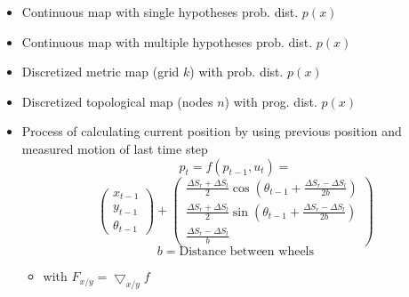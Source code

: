 \begin{itemize}
\begin{itemize}
                \begin{itemize}
                    \item Continuous map with single hypotheses prob. dist. $p(x)$
                    \item Continuous map with multiple hypotheses prob. dist. $p(x)$
                    \item Discretized metric map (grid $k$) with prob. dist. $p(x)$
                    \item Discretized topological map (nodes $n$) with prog. dist. $p(x)$
                \end{itemize}
        \end{itemize}
        \begin{itemize}
            \item Process of calculating current position by using previous position and measured motion of last time step
             
\[
    p_t = f(p_{t - 1}, u_t) =
\]
\[
    \begin{pmatrix}
        x_{t - 1}\\
        y_{t - 1}\\
        \theta_{t - 1}
    \end{pmatrix} +
    \begin{pmatrix}
        \frac{\Delta S_r + \Delta S_l}{2} \cos(\theta_{t - 1} + \frac{\Delta S_r - \Delta S_l}{2b})\\
        \frac{\Delta S_r + \Delta S_l}{2} \sin(\theta_{t - 1} + \frac{\Delta S_r - \Delta S_l}{2b})\\
        \frac{\Delta S_r - \Delta S_l}{b}
    \end{pmatrix}
\]
\[
b = \text{Distance between wheels}
\]
                \begin{itemize}
                     $\Sigma_{p_t} = F_{p_{t-1}} \Sigma_{p_{t-1}} F_{p_{t-1}}^\transpose + F_{\Delta S} \Sigma_{\Delta S} F_{\Delta S}^\transpose$
                     $\Sigma_{\Delta S} =
                        \begin{pmatrix}
                            k_r |\Delta S_r | & 0\\
                            0 & k_l |\Delta S_l|
                        \end{pmatrix}$
                    \item with $F_{x/y} = \bigtriangledown_{x/y} f$
                \end{itemize}
        \end{itemize}
\end{itemize}

